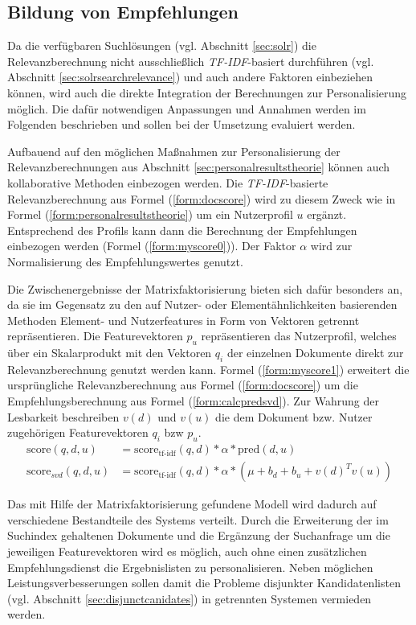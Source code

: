 \subsection{Bildung von Empfehlungen}\label{sec:myrecommend}

Da die verfügbaren Suchlösungen (vgl. Abschnitt \ref{sec:solr}) die Relevanzberechnung nicht ausschließlich \textit{TF-IDF}-basiert durchführen (vgl. Abschnitt \ref{sec:solrsearchrelevance}) und auch andere Faktoren einbeziehen können, wird auch die direkte Integration der Berechnungen zur Personalisierung möglich. Die dafür notwendigen Anpassungen und Annahmen werden im Folgenden beschrieben und sollen bei der Umsetzung evaluiert werden. %

Aufbauend auf den möglichen Maßnahmen zur Personalisierung der Relevanzberechnungen aus Abschnitt  \ref{sec:personalresultstheorie} können auch kollaborative Methoden einbezogen werden. Die \textit{TF-IDF}-basierte Relevanzberechnung aus Formel (\ref{form:docscore}) wird zu diesem Zweck wie in Formel (\ref{form:personalresultstheorie}) um  ein Nutzerprofil $u$ ergänzt. Entsprechend des Profils kann dann die Berechnung der Empfehlungen einbezogen werden (Formel (\ref{form:myscore0})). Der Faktor $\alpha$ wird zur Normalisierung des Empfehlungswertes genutzt.

Die Zwischenergebnisse der Matrixfaktorisierung bieten sich dafür besonders an, da sie im Gegensatz zu den auf Nutzer- oder Elementähnlichkeiten basierenden Methoden Element- und Nutzerfeatures in Form von Vektoren getrennt repräsentieren. Die Featurevektoren $p_u$ repräsentieren das Nutzerprofil, welches über ein Skalarprodukt  mit den Vektoren $q_i$ der einzelnen Dokumente direkt zur Relevanzberechnung genutzt werden kann. Formel (\ref{form:myscore1}) erweitert die ursprüngliche Relevanzberechnung aus Formel (\ref{form:docscore}) um die Empfehlungsberechnung aus Formel (\ref{form:calcpredsvd}). Zur Wahrung der Lesbarkeit beschreiben $v(d)$ und $v(u)$ die dem Dokument bzw. Nutzer zugehörigen Featurevektoren $q_i$ bzw $p_u$.
\begin{align}
\text{score}(q,d,u) & = \text{score}_{\text{tf-idf}}(q,d) * \alpha * \text{pred}(d, u)\label{form:myscore0} \\
\text{score}_{svd}(q,d,u) & = \text{score}_{\text{tf-idf}}(q,d) * \alpha * (\mu + b_d + b_u + v(d)^Tv(u)) \label{form:myscore1}
\end{align}

Das mit Hilfe der Matrixfaktorisierung gefundene Modell wird dadurch auf verschiedene Bestandteile des Systems verteilt. Durch die Erweiterung der im Suchindex gehaltenen Dokumente und die Ergänzung der Suchanfrage um die jeweiligen Featurevektoren wird es möglich, auch ohne einen zusätzlichen Empfehlungsdienst die Ergebnislisten zu personalisieren. Neben möglichen Leistungsverbesserungen sollen damit die Probleme disjunkter Kandidatenlisten (vgl. Abschnitt \ref{sec:disjunctcanidates}) in getrennten Systemen vermieden werden.


